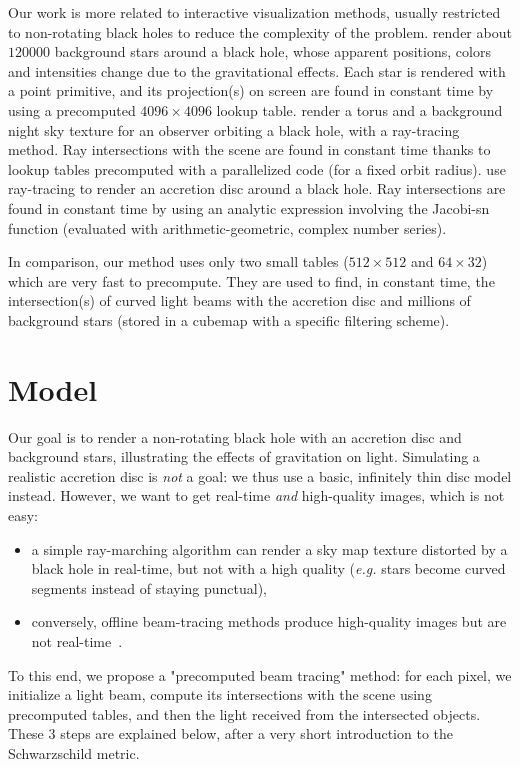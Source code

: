 \documentclass{document}
\begin{document}
Our work is more related to interactive visualization methods, usually 
restricted to non-rotating black holes to reduce the complexity of the problem.
\cite{Muller2010} render about $120000$ background stars around a black hole, 
whose apparent positions, colors and intensities change due to the 
gravitational effects. Each star is rendered with a point primitive, and its 
projection(s) on screen are found in constant time by using a precomputed 
$4096\times4096$ lookup table. \cite{Muller2011} render a torus and a 
background night sky texture for an observer orbiting a black hole, with a 
ray-tracing method. Ray intersections with the scene are found in constant time 
thanks to lookup tables precomputed with a parallelized code (for a fixed orbit 
radius). \cite{Muller2012} use ray-tracing to render an accretion disc around a 
black hole. Ray intersections are found in constant time by using an analytic 
expression involving the Jacobi-sn function (evaluated with 
arithmetic-geometric, complex number series).

In comparison, our method uses only two small tables ($512\times512$ and 
$64\times32$) which are very fast to precompute. They are used to find, in 
constant time, the intersection(s) of curved light beams with the accretion 
disc and millions of background stars (stored in a cubemap with a specific 
filtering scheme).
  
\section{Model}\label{sec:model}

Our goal is to render a non-rotating black hole with an accretion disc and 
background stars, illustrating the effects of gravitation on light. Simulating 
a realistic accretion disc is {\em not} a goal: we thus use a basic, infinitely 
thin disc model instead. However, we want to get real-time {\em and} 
high-quality images, which is not easy:
\begin{itemize}
	\item a simple ray-marching algorithm can render a sky map texture distorted 
	by a black hole in real-time, but not with a high quality ({\em e.g.} stars 
	become curved segments instead of staying punctual),
	\item conversely, offline beam-tracing methods produce high-quality images 
	but are not real-time~\cite{James2015}.
\end{itemize}
To this end, we propose a "precomputed beam tracing" method: for each pixel, we 
initialize a light beam, compute its intersections with the scene using 
precomputed tables, and then the light received from the intersected objects. 
These 3 steps are explained below, after a very short introduction to the 
Schwarzschild metric.
\end{document}
